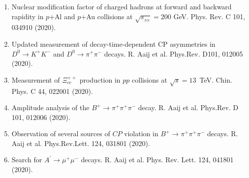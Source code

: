 \documentclass[11pt]{article}
\newcommand{\snn}{\sqrt{s_{_{NN}}}}
\begin{document}
\begin{flushleft}
\begin{center}
\begin{enumerate}
	    \item Nuclear modification factor of charged hadrons at forward and backward rapidity in $p$+Al and $p$+Au collisions at $\snn=200$ GeV. Phys. Rev. C 101, 034910 (2020).
		\item Updated measurement of decay-time-dependent CP asymmetries in $D^0\rightarrow K^+K^-$ and $D^0\rightarrow\pi^+\pi^-$ decays. R. Aaij et al. Phys.Rev. D101, 012005 (2020).
		\item Measurement of $\Xi_{cc}^{++}$ production in $pp$ collisions at $\sqrt{s} = 13$~TeV. Chin. Phys. C 44, 022001 (2020).
		\item Amplitude analysis of the $B^+\rightarrow\pi^+\pi^+\pi^-$ decay. R. Aaij et al. Phys.Rev. D 101, 012006 (2020).
		\item Observation of several sources of $CP$ violation in $B^+\rightarrow\pi^+\pi^+\pi^-$ decays. R. Aaij et al. Phys.Rev.Lett. 124, 031801 (2020).
		\item Search for $A^\prime\rightarrow\mu^+\mu^-$ decays. R. Aaij et al. Phys. Rev. Lett. 124, 041801 (2020).
	

\end{enumerate}
\end{center}
\end{flushleft}
\end{document}
